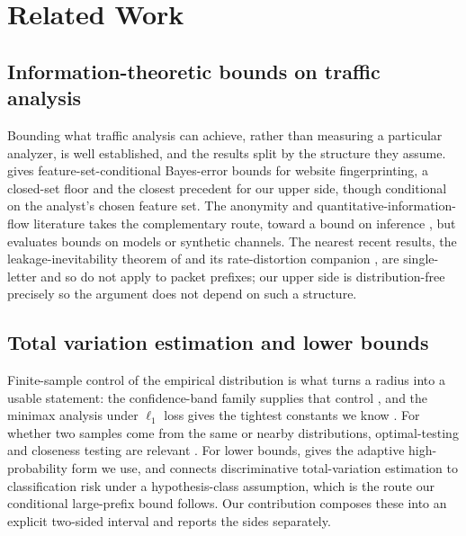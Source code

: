 \section{Related Work}
\label{sec:related}

\subsection{Information-theoretic bounds on traffic analysis}
\label{sec:related/bounds}

Bounding what traffic analysis can achieve, rather than measuring a particular
analyzer, is well established, and the results split by the structure they
assume. \citet{cherubin2017bayes} gives feature-set-conditional Bayes-error
bounds for website fingerprinting, a closed-set floor and the closest precedent
for our upper side, though conditional on the analyst's chosen feature set. The
anonymity and quantitative-information-flow literature takes the complementary
route, toward a bound on inference
\citep{serjantov2003metric,ghaderi2010anonymous,venkitasubramaniam2008eavesdroppers,venkitasubramaniam2008chaum,chatzikokolakis2007error,chatzikokolakis2008noisy},
but evaluates bounds on models or synthetic channels. The nearest recent results, the
leakage-inevitability theorem of \citet{liu2026inevitability} and its
rate-distortion companion \citep{liu2026rate}, are single-letter and so do not
apply to packet prefixes; our upper side is distribution-free precisely so the
argument does not depend on such a structure.

\subsection{Total variation estimation and lower bounds}
\label{sec:related/tv}

Finite-sample control of the empirical distribution is what turns a radius into
a usable statement: the confidence-band family supplies that control
\citep{wei2011dkwtwo,reeve2024dkwmassart}, and the minimax analysis under
$\ell_1$ loss gives the tightest constants we know
\citep{han2015l1distribution,jiao2018l1distance}. For whether two samples come
from the same or nearby distributions, optimal-testing and closeness testing are
relevant \citep{diakonikolas2020highprob,chan2013closeness}. For lower bounds,
\citet{michel2020high} gives the adaptive high-probability form we use, and
\citet{tao2024discriminative} connects discriminative total-variation estimation
to classification risk under a hypothesis-class assumption, which is the route
our conditional large-prefix bound follows. Our contribution composes these into an
explicit two-sided interval and reports the sides separately.

